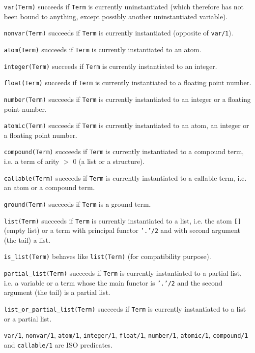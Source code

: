 \Description

\texttt{var(Term)} succeeds if \texttt{Term} is currently
uninstantiated (which therefore has not been bound to anything, except
possibly another uninstantiated variable).

\texttt{nonvar(Term)} succeeds if \texttt{Term} is currently instantiated
(opposite of \texttt{var/1}).

\texttt{atom(Term)} succeeds if \texttt{Term} is currently instantiated
to an atom.

\texttt{integer(Term)} succeeds if \texttt{Term} is currently
instantiated to an integer.

\texttt{float(Term)} succeeds if \texttt{Term} is currently instantiated
to a floating point number.

\texttt{number(Term)} succeeds if \texttt{Term} is currently instantiated
to an integer or a floating point number.

\texttt{atomic(Term)} succeeds if \texttt{Term} is currently instantiated
to an atom, an integer or a floating point number.

\texttt{compound(Term)} succeeds if \texttt{Term} is currently
instantiated to a compound term, i.e. a term of arity $>$ 0 (a list or a
structure).

\texttt{callable(Term)} succeeds if \texttt{Term} is currently
instantiated to a callable term, i.e. an atom or a compound term.

\texttt{ground(Term)} succeeds if \texttt{Term} is a ground term.

\texttt{list(Term)} succeeds if \texttt{Term} is currently instantiated
to a list, i.e. the atom \texttt{[]} (empty list) or a term with principal
functor \texttt{'.'/2} and with second argument (the tail) a list.

\texttt{is\_list(Term)} behaves like \texttt{list(Term)} (for compatibility
purpose).

\texttt{partial\_list(Term)} succeeds if \texttt{Term} is currently
instantiated to a partial list, i.e. a variable or a term whose the main
functor is \texttt{'.'/2} and the second argument (the tail) is a partial
list.

\texttt{list\_or\_partial\_list(Term)} succeeds if \texttt{Term} is
currently instantiated to a list or a partial list.

\PlErrorsNone

\Portability

\texttt{var/1}, \texttt{nonvar/1}, \texttt{atom/1}, \texttt{integer/1},
\texttt{float/1}, \texttt{number/1}, \texttt{atomic/1}, \texttt{compound/1}
and \texttt{callable/1} are ISO predicates.

